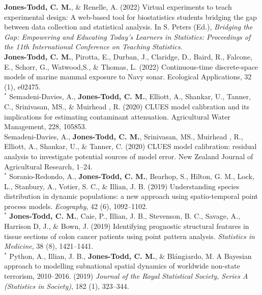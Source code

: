 \documentclass[10pt,a4paper]{moderncv}
\begin{document}
  \textbf{Jones-Todd, C. M.}, \& Renelle, A. (2022) Virtual experiments to teach experimental design: A web-based tool for biostatistics students bridging the gap between data collection and statistical analysis. In S. Peters (Ed.), \textit{Bridging the Gap: Empowering and Educating Today's Learners in Statistics: Proceedings of the 11th International Conference on Teaching Statistics}.\\
  
  \textbf{Jones-Todd, C. M.}, Pirotta, E., Durban, J., Claridge, D., Baird, R., Falcone, E., Schorr, G., Watwood,S., \& Thomas, L.  (2022) Continuous-time discrete-space models of marine mammal exposure to Navy sonar. Ecological Applications, 32 (1), e02475.\\
 
  ${}^\ast$ Semadeni-Davies, A., \textbf{Jones-Todd, C. M.},  Elliott, A., Shankar, U., Tanner, C., Srinivasan, MS., \& Muirhead , R. (2020) CLUES model calibration and its implications for estimating contaminant attenuation. Agricultural Water Management, 228, 105853.\\

    Semadeni-Davies, A., \textbf{Jones-Todd, C. M.}, Srinivasan, MS.,  Muirhead , R.,  Elliott, A., Shankar, U., \& Tanner, C. (2020) CLUES model calibration: residual analysis to investigate potential sources of model error. New Zealand Journal of Agricultural Research, 1--24.\\

${}^\ast$ Soranio-Redondo, A., \textbf{Jones-Todd, C. M.}, Bearhop, S., Hilton, G. M., Lock, L., Stanbury, A., Votier, S. C., \& Illian, J. B. (2019) Understanding species distribution in dynamic populations: a new approach using spatio-temporal point process models. \textit{Ecography}, 42 (6), 1092--1102.\\
  
\vspace{-3pt}
${}^\ast$ \textbf{Jones-Todd, C. M.}, Caie, P., Illian, J. B., Stevenson, B. C., Savage, A., Harrison D, J., \& Bown, J. (2019) Identifying prognostic structural features in tissue sections of colon cancer patients using point pattern analysis. \textit{Statistics in Medicine}, 38 (8), 1421--1441.\\

\vspace{-3pt}
${}^\ast$ Python, A.,  Illian, J. B., \textbf{Jones-Todd, C. M.}, \& Bl\'{a}ngiardo, M. A Bayesian approach to modelling subnational spatial dynamics of worldwide non-state terrorism, 2010--2016. (2019) \textit{Journal of the Royal Statistical Society, Series  A (Statistics in Society)}, 182 (1), 323--344.\\
\end{document}
